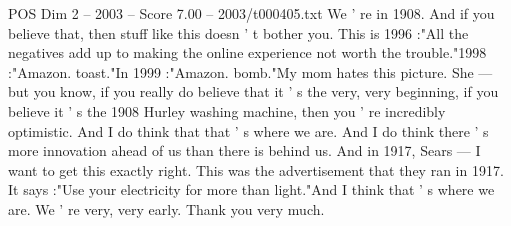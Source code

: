 \begin{textsample}{POS Dim 2 – 2003 – Score 7.00 – 2003/t000405.txt}
We ' re in 1908.
And if you believe that, then stuff like this doesn ' t bother you.
This is 1996 :"All the negatives add up to making the online experience not worth the trouble."1998 :"Amazon. toast."In 1999 :"Amazon. bomb."My mom hates this picture.
She — but you know, if you really do believe that it ' s the very, very beginning, if you believe it ' s the 1908 Hurley washing machine, then you ' re incredibly optimistic.
And I do think that that ' s where we are.
And I do think there ' s more innovation ahead of us than there is behind us.
And in 1917, Sears — I want to get this exactly right.
This was the advertisement that they ran in 1917.
It says :"Use your electricity for more than light."And I think that ' s where we are.
We ' re very, very early.
Thank you very much.

\end{textsample}
